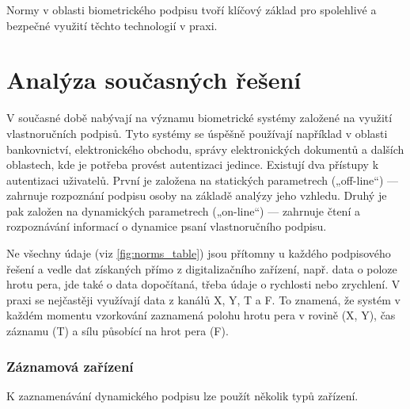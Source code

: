 Normy v oblasti biometrického podpisu tvoří klíčový základ pro spolehlivé a bezpečné využití těchto technologií v praxi.


\chapter{Analýza současných řešení}

V současné době nabývají na významu biometrické systémy založené na využití vlastnoručních podpisů. 
Tyto systémy se úspěšně používají například v oblasti bankovnictví, elektronického obchodu, správy elektronických dokumentů a dalších oblastech, kde je potřeba provést autentizaci jedince. 
Existují dva přístupy k autentizaci uživatelů.
První je založena na statických parametrech („off-line“) --- zahrnuje rozpoznání podpisu osoby na základě analýzy jeho vzhledu.
Druhý je pak založen na dynamických parametrech („on-line“) --- zahrnuje čtení a rozpoznávání informací o dynamice psaní vlastnoručního podpisu. %

Ne všechny údaje (viz \ref{fig:norms_table}) jsou přítomny u každého podpisového řešení a vedle dat získaných přímo z digitalizačního zařízení, např. data o poloze hrotu pera, jde také o data dopočítaná, třeba údaje o rychlosti nebo zrychlení. %
V praxi se nejčastěji využívají data z kanálů X, Y, T a F. To znamená, že systém v každém momentu vzorkování zaznamená polohu hrotu pera v rovině (X, Y), čas záznamu (T) a sílu působící na hrot pera (F). %

\subsection*{Záznamová zařízení}
K zaznamenávání dynamického podpisu lze použít několik typů zařízení.


